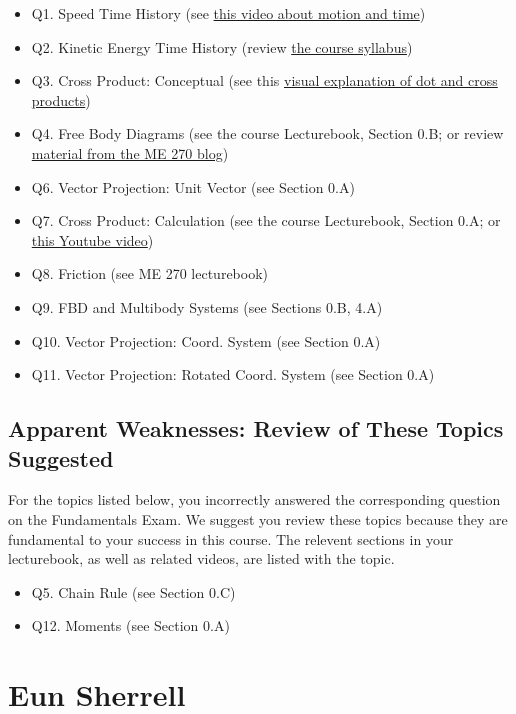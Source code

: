 \documentclass[11pt,letterpaper]{article}\usepackage[]{graphicx}\usepackage[]{color}
\begin{document}
\begin{itemize}\item Q1. Speed Time History (see \href{https://www.youtube.com/watch?v=lZPtFDXYQRU}{this video about motion and time})
\item Q2. Kinetic Energy Time History (review \href{https://www.purdue.edu/freeform/dynamics/wp-content/uploads/sites/4/2018/01/Syllabus-Spring-2018.pdf}{the course syllabus})
\item Q3. Cross Product: Conceptual (see this \href{https://www.youtube.com/watch?v=h0NJK4mEIJU&t=8s}{visual explanation of dot and cross products})
\item Q4. Free Body Diagrams (see the course Lecturebook, Section 0.B; or review \href{https://www.purdue.edu/statics/}{material from the ME 270 blog})
\item Q6. Vector Projection: Unit Vector (see Section 0.A)
\item Q7. Cross Product: Calculation (see the course Lecturebook, Section 0.A; or \href{https://www.youtube.com/watch?v=DmPxjmymM7k}{this Youtube video})
\item Q8. Friction (see ME 270 lecturebook)
\item Q9. FBD and Multibody Systems (see Sections 0.B, 4.A)
\item Q10. Vector Projection: Coord. System (see Section 0.A)
\item Q11. Vector Projection: Rotated Coord. System (see Section 0.A)
\end{itemize}\subsection*{Apparent Weaknesses: Review of These Topics Suggested}
For the topics listed below, you incorrectly answered the corresponding question on the Fundamentals Exam.  We suggest you review these topics because they are fundamental to your success in this course.  The relevent sections in your lecturebook, as well as related videos, are listed with the topic.

\begin{itemize}\item Q5. Chain Rule (see Section 0.C)
\item Q12. Moments (see Section 0.A)
\end{itemize}

\pagebreak
\section*{Eun Sherrell}
\end{document}
